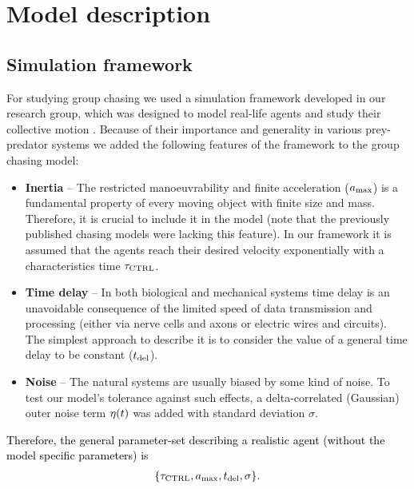 \documentclass[12pt,a4paper,final]{iopart}
\newcommand{\revision}{\textcolor{black}}
\begin{document}

\section{Model description}


\subsection{Simulation framework}

For studying group chasing we used a simulation framework developed in our research group, which was designed to model real-life agents and study their collective motion \cite{viragh2014flocking, vasarhelyi2014outdoor}. Because of their importance and generality in various prey-predator systems we added the following features of the framework to the group chasing model:

\begin{itemize}
\item {\bf Inertia } -- The restricted manoeuvrability and finite acceleration \revision{($a_{\rm max}$)} is a fundamental property of every moving object with finite size and mass. Therefore, it is crucial to include it in the model (note that the previously published chasing models were lacking this feature). In our framework it is assumed that the agents reach their desired velocity exponentially with a characteristics time $\tau_{\rm CTRL}$.

\item{\bf Time delay} -- In both biological and mechanical systems time delay is an unavoidable consequence of the limited speed of data transmission and processing (either via nerve cells and axons or electric wires and circuits). The simplest approach to describe it is to consider the value of a general time delay to be constant ($t_{\rm del}$).

\item{\bf Noise} -- The natural systems are usually biased by some kind of noise. To test our model's tolerance against such effects, a delta-correlated (Gaussian) outer noise term ${\bf \eta}(t)$ was added with standard deviation $\sigma$. 
\end{itemize}
\revision{Therefore, the general parameter-set describing a realistic agent (without the model specific parameters) is
\begin{eqnarray}
\{\tau_{\rm CTRL}, a_{\rm max}, t_{\rm del}, \sigma \}.
\end{eqnarray}
}
\end{document}
